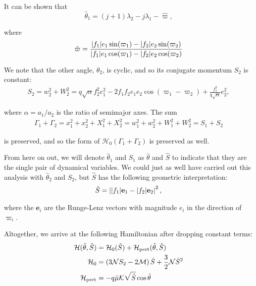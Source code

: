 \documentclass[usenatbib]{mnras}
\DeclarePairedDelimiter{\abs}{|}{|}
\begin{document}
\noindent
It can be shown that
\begin{equation}
  \hat{\theta}_1 = (j+1)\lambda_2-j\lambda_1
  - \hat\varpi,
\end{equation}

\noindent
where
\begin{equation}
\hat\varpi = \frac{\abs{f_1} e_1\sin(\varpi_1) -
  \abs{f_2}e_2\sin(\varpi_2)} {\abs{f_1}e_1\cos(\varpi_1) -
  \abs{f_2}e_2\cos(\varpi_2)}
\end{equation}

\noindent
We note that the other angle, \(\hat\theta_2\),
is cyclic, and so its conjugate momentum \(S_2\) is constant:
\begin{align}
  S_2 = w_2^2 + W_2^2 = q\sqrt{\alpha}f_2^2e_1^2
-2f_1f_2e_1e_2\cos(\varpi_1-\varpi_2) + \frac{f_1^2}{q\sqrt\alpha}e_2^2
,
\end{align}

\noindent
where \(\alpha=a_1/a_2\) is the ratio of semimajor axes.
The sum
\begin{align}
  \Gamma_1 +\Gamma_2 = x_1^2+x_2^2 + X_1^2 + X_2^2
  = w_1^2+w_2^2 + W_1^2 + W_2^2 = S_1 + S_2
\end{align}

\noindent
is preserved, and so the form of \(\mathcal H_0(\Gamma_1+\Gamma_2)\)
is preserved as well.

From here on out, we will denote \(\hat\theta_1\) and \(S_1\) as
\(\hat\theta\) and \(\hat S\) to indicate that they are the single pair of
dynamical variables.  We could just as well have carried out this
analysis with \(\hat\theta_2\) and \(S_2\), but \(\hat S\) has the following
geometric interpretation:
\begin{align}
  \hat S = \left\lvert \abs{f_1}\mathbf{e}_1 - \abs{f_2}\mathbf{e}_2\right\rvert^2,
\end{align}

\noindent
where the \(\mathbf{e}_i\) are the Runge-Lenz vectors with magnitude
\(e_i\) in the direction of \(\varpi_i\).  

Altogether, we arrive at the following Hamiltonian after
dropping constant terms:
\begin{align}
  \label{eq:HShat}\mathcal H(\hat \theta, \hat S) &= \mathcal H_0(\hat S) + \mathcal H_{\rm pert}(\hat \theta, \hat S) \\
  \mathcal H_0
  &= \left( 3\mathcal NS_2 -2\mathcal M\right) \hat S
    + \frac32 \mathcal N \hat S^2 \\
  \mathcal H_{\rm pert}
  &= - q\tilde\mu\mathcal K\sqrt{\hat S}\cos\hat\theta
\end{align}
\end{document}
